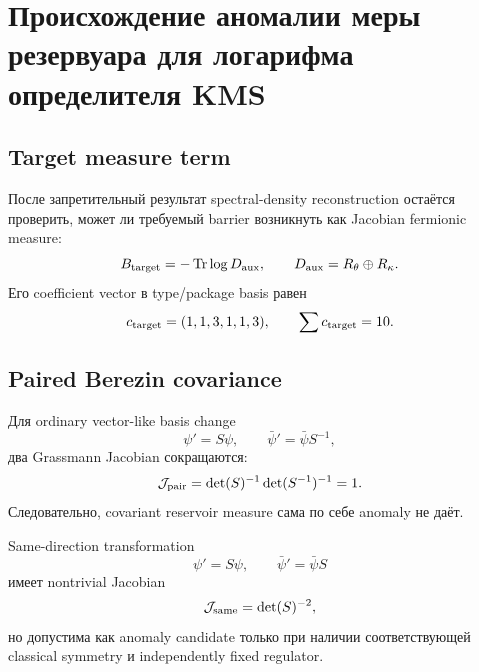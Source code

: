 \chapter{Происхождение аномалии меры резервуара для логарифма определителя KMS}
\label{ch:v9-kms-reservoir-measure-anomaly}

\section{Target measure term}

После запретительный результат spectral-density reconstruction остаётся проверить, может ли
требуемый barrier возникнуть как Jacobian fermionic measure:
\begin{equation}
 B_{\rm target}=-\operatorname{Tr}\log D_{\rm aux},
 \qquad D_{\rm aux}=R_\theta\oplus R_\kappa.
 \label{eq:v9-kms-anomaly-target}
\end{equation}
Его coefficient vector в type/package basis равен
\begin{equation}
 c_{\rm target}=(1,1,3,1,1,3),
 \qquad \sum c_{\rm target}=10.
 \label{eq:v9-kms-anomaly-target-vector}
\end{equation}

\section{Paired Berezin covariance}

Для ordinary vector-like basis change
\begin{equation}
 \psi'=S\psi,
 \qquad \bar\psi'=\bar\psi S^{-1},
 \label{eq:v9-kms-anomaly-paired-change}
\end{equation}
два Grassmann Jacobian сокращаются:
\begin{equation}
 \mathcal J_{\rm pair}
 =\det(S)^{-1}\det(S^{-1})^{-1}=1.
 \label{eq:v9-kms-anomaly-paired-jacobian}
\end{equation}
Следовательно, covariant reservoir measure сама по себе anomaly не даёт.

Same-direction transformation
\begin{equation}
 \psi'=S\psi,
 \qquad \bar\psi'=\bar\psi S
 \label{eq:v9-kms-anomaly-same-change}
\end{equation}
имеет nontrivial Jacobian
\begin{equation}
 \mathcal J_{\rm same}=\det(S)^{-2},
 \label{eq:v9-kms-anomaly-same-jacobian}
\end{equation}
но допустима как anomaly candidate только при наличии соответствующей
classical symmetry и independently fixed regulator.

